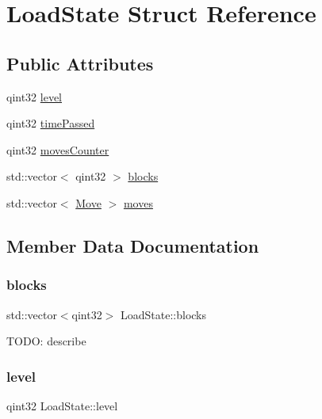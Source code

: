 \hypertarget{struct_load_state}{}\section{Load\+State Struct Reference}
\label{struct_load_state}
\subsection*{Public Attributes}
\begin{DoxyCompactItemize}
\item 
qint32 \mbox{\hyperlink{struct_load_state_ab48ca57dd161df569b22a88f457df244}{level}}
\item 
qint32 \mbox{\hyperlink{struct_load_state_a1c37e682001c48d107c981f9e225e83c}{time\+Passed}}
\item 
qint32 \mbox{\hyperlink{struct_load_state_a72929d48135962cbff700c440a57553f}{moves\+Counter}}
\item 
std\+::vector$<$ qint32 $>$ \mbox{\hyperlink{struct_load_state_a1496d8006e1f1ec80803818ed11038eb}{blocks}}
\item 
std\+::vector$<$ \mbox{\hyperlink{struct_move}{Move}} $>$ \mbox{\hyperlink{struct_load_state_a00e978ec8c48f99e7007814da01f328b}{moves}}
\end{DoxyCompactItemize}


\subsection{Member Data Documentation}
\mbox{\label{struct_load_state_a1496d8006e1f1ec80803818ed11038eb}} 
\subsubsection{\texorpdfstring{blocks}{blocks}}
{\footnotesize\ttfamily std\+::vector$<$qint32$>$ Load\+State\+::blocks}

T\+O\+DO\+: describe \mbox{\label{struct_load_state_ab48ca57dd161df569b22a88f457df244}} 
\subsubsection{\texorpdfstring{level}{level}}
{\footnotesize\ttfamily qint32 Load\+State\+::level}

